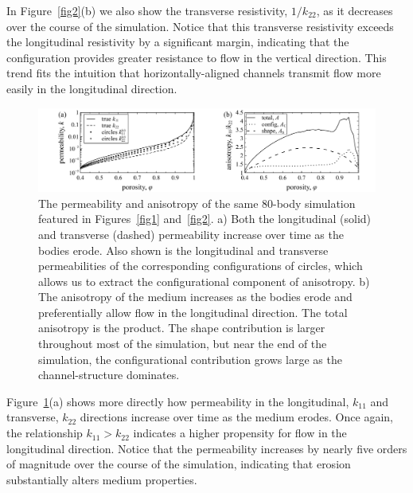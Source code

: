 \documentclass[3p]{elsarticle}
\begin{document}
In Figure~\ref{fig2}(b) we also show the transverse resistivity, $1/k_{22}$, as it decreases over the course of the simulation. Notice that this transverse resistivity exceeds the longitudinal resistivity by a significant margin, indicating that the configuration provides greater resistance to flow in the vertical direction. This trend fits the intuition that horizontally-aligned channels transmit flow more easily in the longitudinal direction.

\begin{figure}%
\centering
\includegraphics[width = 0.99 \textwidth]{./figs/fig3.pdf}
\caption{
The permeability and anisotropy of the same 80-body simulation featured in Figures~\ref{fig1} and~\ref{fig2}. a) Both the longitudinal (solid) and transverse (dashed) permeability increase over time as the bodies erode. Also shown is the longitudinal and transverse permeabilities of the corresponding configurations of circles, which allows us to extract the configurational component of anisotropy. b) The anisotropy of the medium increases as the bodies erode and preferentially allow flow in the longitudinal direction. The total anisotropy is the product. The shape contribution is larger throughout most of the simulation, but near the end of the simulation, the configurational contribution grows large as the channel-structure dominates.
\label{fig3}
}
\end{figure}

Figure~\ref{fig3}(a) shows more directly how permeability in the longitudinal, $k_{11}$ and transverse, $k_{22}$ directions increase over time as the medium erodes. Once again, the relationship $k_{11} > k_{22}$ indicates a higher propensity for flow in the longitudinal direction. Notice that the permeability increases by nearly five orders of magnitude over the course of the simulation, indicating that erosion substantially alters medium properties.
\end{document}
